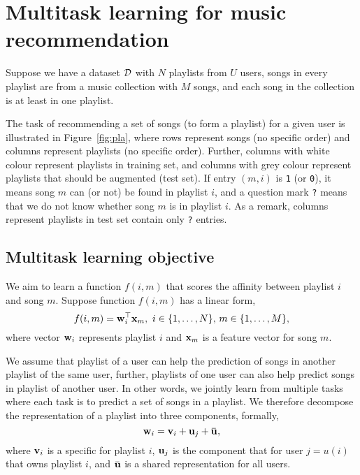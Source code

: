 \section{Multitask learning for music recommendation}

Suppose we have a dataset $\mathcal{D}$ with $N$ playlists from $U$ users, songs in every playlist are from a music collection 
with $M$ songs, and each song in the collection is at least in one playlist.

The task of recommending a set of songs (to form a playlist) for a given user is illustrated in Figure~\ref{fig:pla},
where rows represent songs (no specific order) and columns represent playlists (no specific order).
Further, columns with white colour represent playlists in training set, 
and columns with grey colour represent playlists that should be augmented (\ie test set).
If entry $(m, i)$ is \texttt{1} (or \texttt{0}), 
it means song $m$ can (or not) be found in playlist $i$,
and a question mark \texttt{?} means that we do not know whether song $m$ is in playlist $i$.
As a remark, columns represent playlists in test set contain only \texttt{?} entries.





\subsection{Multitask learning objective}

%
We aim to learn a function $f(i, m)$ that scores the affinity between playlist $i$ and song $m$.
Suppose function $f(i, m)$ has a linear form, \ie
$$
f(i, m) = \mathbf{w}_i^\top \mathbf{x}_m, \ i \in \{1,\dots,N\}, \, m \in \{1,\dots,M\},
$$
where vector $\mathbf{w}_i$ represents playlist $i$ and $\mathbf{x}_m$ is a feature vector for song $m$.

We assume that playlist of a user can help the prediction of songs in another playlist of the same user,
further, playlists of one user can also help predict songs in playlist of another user.
In other words, we jointly learn from multiple tasks where each task is to predict a set of songs in a playlist.
We therefore decompose the representation of a playlist into three components, formally,
$$
\w_i = \bv_i + \bu_j + \widebar\bu,
$$
where $\mathbf{v}_i$ is a specific for playlist $i$, $\mathbf{u}_j$ is the component that for user $j=u(i)$ that owns playlist $i$,
and $\widebar\bu$ is a shared representation for all users.


